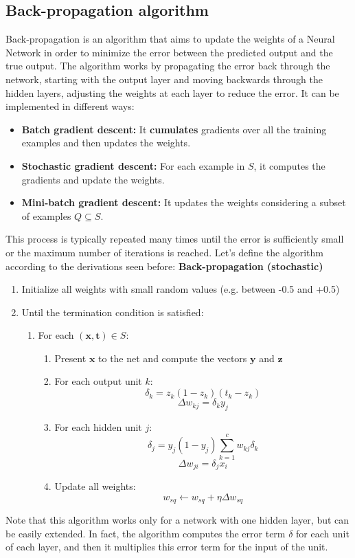 \subsection{Back-propagation algorithm}
Back-propagation is an algorithm that aims to update the weights of a Neural Network in order to minimize the error between the predicted output and the true output. The algorithm works by propagating the error back through the network, starting with the output layer and moving backwards through the hidden layers, adjusting the weights at each layer to reduce the error. It can be implemented in different ways:
\begin{itemize}
    \item \textbf{Batch gradient descent:} It \textbf{cumulates} gradients over all the training examples and then updates the weights.
    \item \textbf{Stochastic gradient descent:} For each example in $S$, it computes the gradients and update the weights.
    \item \textbf{Mini-batch gradient descent:} It updates the weights considering a subset of examples $Q \subseteq S$. 
\end{itemize}
This process is typically repeated many times until the error is sufficiently small or the maximum number of iterations is reached. Let's define the algorithm according to the derivations seen before:\newline\newline
\textbf{Back-propagation (stochastic)}
\begin{enumerate}
    \item Initialize all weights with small random values (e.g. between -0.5 and +0.5)
    \item Until the termination condition is satisfied:
    \begin{enumerate}
        \item For each $(\textbf{x},\textbf{t}) \in S$:
        \begin{enumerate}
            \item Present $\textbf{x}$ to the net and compute the vectors $\textbf{y}$ and $\textbf{z}$
            \item For each output unit $k$:
            \[\delta_{k} = z_{k}(1 - z_{k})(t_{k} - z_{k})\]
            \[\Delta w_{kj} = \delta_{k}y_{j}\]

            \item For each hidden unit $j$:
            \[\delta_{j} = y_{j}(1 - y_{j})\sum_{k=1}^{c}w_{kj}\delta_{k}\]
            \[\Delta w_{ji} = \delta_{j}x_{i}\]

            \item Update all weights:
            \[w_{sq} \leftarrow w_{sq} + \eta \Delta w_{sq}\]
        \end{enumerate}
    \end{enumerate}
\end{enumerate}
Note that this algorithm works only for a network with one hidden layer, but can be easily extended. In fact, the algorithm computes the error term $\delta$ for each unit of each layer, and then it multiplies this error term for the input of the unit.

